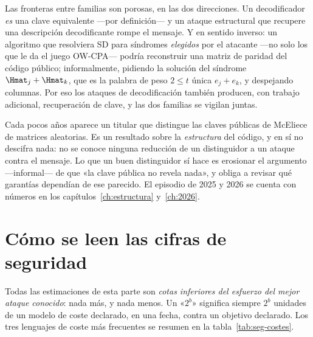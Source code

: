 Las fronteras entre familias son porosas, en las dos direcciones. Un
decodificador \emph{es} una clave equivalente ---por definición--- y
un ataque estructural que recupere una descripción decodificante
rompe el mensaje. Y en sentido inverso: un algoritmo que resolviera
SD para síndromes \emph{elegidos} por el atacante ---no solo los que
le da el juego OW-CPA--- podría reconstruir una matriz de paridad del
código público; informalmente, pidiendo la solución del síndrome
$\Hmat_j+\Hmat_k$, que es la palabra de peso $2\le t$ única
$e_j+e_k$, y despejando columnas. Por eso los ataques de
decodificación también producen, con trabajo adicional, recuperación
de clave, y las dos familias se vigilan juntas.

\begin{trampa}
Cada pocos años aparece un titular que distingue las claves públicas
de McEliece de matrices aleatorias. Es un resultado sobre la
\emph{estructura} del código, y en sí no descifra nada: no se conoce
ninguna reducción de un distinguidor a un ataque contra el mensaje.
Lo que un buen distinguidor sí hace es erosionar el argumento
---informal--- de que «la clave pública no revela nada», y obliga a
revisar qué garantías dependían de ese parecido. El episodio de 2025
y 2026 se cuenta con números en los
capítulos~\ref{ch:estructura} y~\ref{ch:2026}.
\end{trampa}

\section{Cómo se leen las cifras de seguridad}

Todas las estimaciones de esta parte son \emph{cotas inferiores del
esfuerzo del mejor ataque conocido}: nada más, y nada menos. Un
«$2^b$» significa siempre $2^b$ unidades de un modelo de coste
declarado, en una fecha, contra un objetivo declarado. Los tres
lenguajes de coste más frecuentes se resumen en la
tabla~\ref{tab:seg-costes}.

